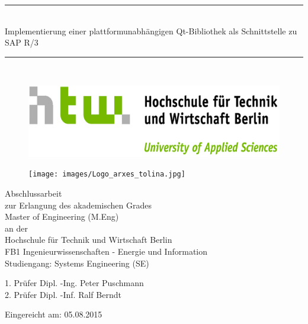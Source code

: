 \thispagestyle{empty}
\cleardoublepage


\begin{center}

\vspace*{\fill}

{\Large
	\newcommand{\HRule}{\rule{350pt}{0.6mm}}
	\HRule \\[0.1cm]
	Implementierung einer plattformunabhängigen Qt-Bibliothek als Schnittstelle zu SAP R/3
	\HRule \\[0.1cm]
}
\end{center}



\begin{minipage}[c]{0.5\textwidth}
	\begin{figure}[H]
		\centering
		\includegraphics[scale=1.2]{images/HTW_Logo2.jpg}
		\label{logo_htw2}
	\end{figure}
\end{minipage}
\begin{minipage}[c]{0.5\textwidth}
	\begin{figure}[H]
		\centering
		\texttt{[image: images/Logo\_arxes\_tolina.jpg]}
		\label{logo_arxes}
	\end{figure}
\end{minipage}





\vspace*{\fill}

{\large 
	Abschlussarbeit\\
	zur Erlangung des akademischen Grades\\
	Master of Engineering (M.Eng)\\
	
	an der \\
	
	Hochschule für Technik und Wirtschaft Berlin\\
	FB1 Ingenieurwissenschaften - Energie und Information\\
	Studiengang: Systems Engineering (SE)
	\vspace{20pt}
	
	1. Prüfer Dipl. -Ing. Peter Puschmann\\
	2. Prüfer Dipl. -Inf. Ralf Berndt \\
	
	\vspace{25pt}
	
	
	Eingereicht am: 05.08.2015
}




